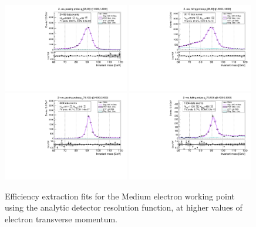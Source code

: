 \begin{figure}
\centering
\includegraphics[width=0.49\textwidth]{figures/Zee_ResFunc_BkgLPiEMu_pass_ptBin3_etaBin23.pdf}
\includegraphics[width=0.49\textwidth]{figures/Zee_ResFunc_BkgLPiEMu_fail_ptBin3_etaBin23.pdf}
\includegraphics[width=0.49\textwidth]{figures/Zee_ResFunc_BkgLPiEMu_pass_ptBin14_etaBin17.pdf}
\includegraphics[width=0.49\textwidth]{figures/Zee_ResFunc_BkgLPiEMu_fail_ptBin14_etaBin17.pdf}
\caption{Efficiency extraction fits for the Medium electron working point using the analytic detector resolution function, at higher values of electron transverse momentum.}
\label{fig:ZeeAltSigResFits2}
\end{figure}

